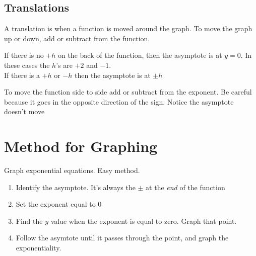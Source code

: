 \documentclass[12pt]{article}
\begin{document}
\pagebreak

\subsection{Translations}

A translation is when a function is moved around the graph. To move the graph up or down, add or subtract from the function.

\begin{center}
\end{center}

If there is no $+h$ on the back of the function, then the asymptote is at $y=0$. In these cases the $h$'s are $+2$ and $-1$.\\

If there is a $+h$ or $-h$ then the asymptote is at $\pm h$\\

\hrulefill

To move the function side to side add or subtract from the exponent. Be careful because it goes in the opposite direction of the sign. Notice the asymptote doesn't move\\

\begin{center}
\end{center}

\pagebreak

\section{Method for Graphing}

\newcommand{\graph}{
\begin{tikzpicture}[scale=0.3]
   \tkzInit[xmax=10,ymax=10,xmin=-10,ymin=-10]
   \tkzGrid
   \tkzAxeXY
   
  \end{tikzpicture}
  }

Graph exponential equations. Easy method.

\begin{enumerate}
	\item Identify the asymptote. It's always the $\pm$ at the \textit{end} of the function
	
	\item Set the exponent equal to $0$
	
	\item Find the $y$ value when the exponent is equal to zero. Graph that point.
	
	\item Follow the asymtote until it passes through the point, and graph the exponentiality. \\
\end{enumerate}
\end{document}
